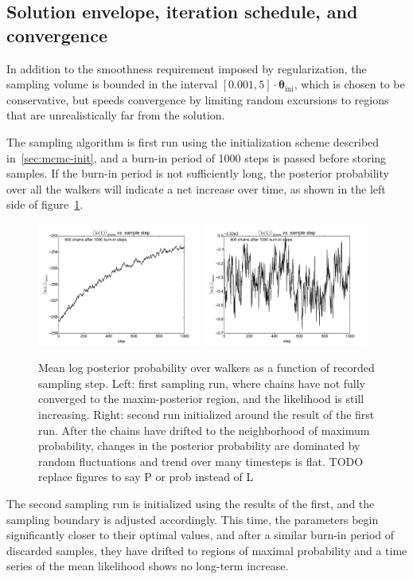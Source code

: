 \documentclass[12pt]{article}
\newcommand{\thetavec}{\mathbf{\theta}}
\begin{document}
\subsection{Solution envelope, iteration schedule, and convergence}
In addition to the smoothness requirement imposed by regularization, the sampling volume is bounded in the interval $[0.001, 5] \cdot \thetavec_{\mathrm{ini}}$, which is chosen to be conservative, but speeds convergence by limiting random excursions to regions that are unrealistically far from the solution.

The sampling algorithm is first run using the initialization scheme described in~\ref{sec:mcmc-init}, and a burn-in period of 1000 steps is passed before storing samples. If the burn-in period is not sufficiently long, the posterior probability over all the walkers will indicate a net increase over time, as shown in the left side of figure~\ref{fig:timeseries}.
\begin{figure}[tb]
  \begin{center}
    \includegraphics[width=0.48\textwidth]{AuAu200MB/1/lnprob-vs-step}
    \includegraphics[width=0.48\textwidth]{AuAu200MB/2/lnprob-vs-step}
  \end{center}
  \caption{Mean log posterior probability over walkers as a function of recorded sampling step. Left: first sampling run, where chains have not fully converged to the maxim-posterior region, and the likelihood is still increasing. Right: second run initialized around the result of the first run. After the chains have drifted to the neighborhood of maximum probability, changes in the posterior probability are dominated by random fluctuations and trend over many timesteps is flat. TODO replace figures to say P or prob instead of L}
  \label{fig:timeseries}
\end{figure}
The second sampling run is initialized using the results of the first, and the sampling boundary is adjusted accordingly. This time, the parameters begin significantly closer to their optimal values, and after a similar burn-in period of discarded samples, they have drifted to regions of maximal probability and a time series of the mean likelihood shows no long-term increase.
\end{document}
